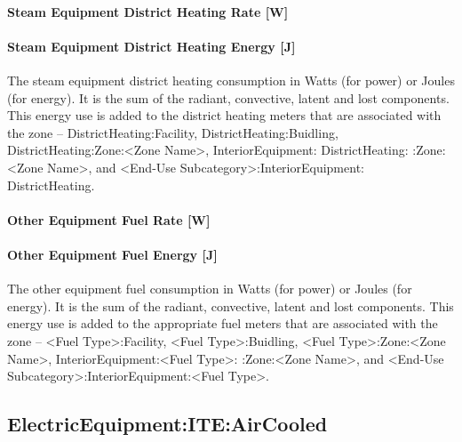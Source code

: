 \paragraph{Steam Equipment District Heating Rate {[}W{]}}\label{steam-equipment-district-heating-rate-w}

\paragraph{Steam Equipment District Heating Energy {[}J{]}}\label{steam-equipment-district-heating-energy-j}

The steam equipment district heating consumption in Watts (for power) or Joules (for energy). It is the sum of the radiant, convective, latent and lost components. This energy use is added to the district heating meters that are associated with the zone -- DistrictHeating:Facility, DistrictHeating:Buidling, DistrictHeating:Zone:\textless{}Zone Name\textgreater{}, InteriorEquipment: DistrictHeating: :Zone:\textless{}Zone Name\textgreater{}, and \textless{}End-Use Subcategory\textgreater{}:InteriorEquipment: DistrictHeating.

\paragraph{Other Equipment Fuel Rate {[}W{]}}\label{otherequip-fuel-rate}

\paragraph{Other Equipment Fuel Energy {[}J{]}}\label{otherequip-fuel-energy}

The other equipment fuel consumption in Watts (for power) or Joules (for energy). It is the sum of the radiant, convective, latent and lost components. This energy use is added to the appropriate fuel meters that are associated with the zone -- \textless{}Fuel Type\textgreater{}:Facility, \textless{}Fuel Type\textgreater{}:Buidling, \textless{}Fuel Type\textgreater{}:Zone:\textless{}Zone Name\textgreater{}, InteriorEquipment:\textless{}Fuel Type\textgreater{}: :Zone:\textless{}Zone Name\textgreater{}, and \textless{}End-Use Subcategory\textgreater{}:InteriorEquipment:\textless{}Fuel Type\textgreater{}.

\subsection{ElectricEquipment:ITE:AirCooled}\label{electricequipmentiteaircooled}


